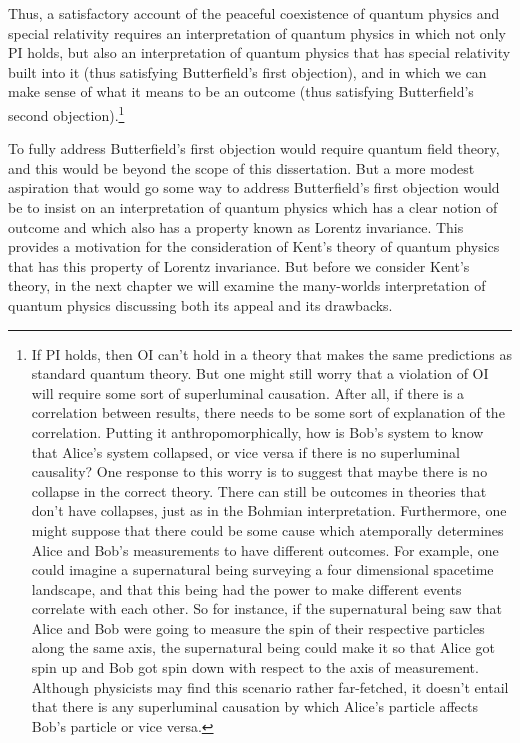 \documentclass[12pt]{report}
\begin{document}
Thus, a satisfactory account of the peaceful coexistence of quantum physics and special relativity requires an interpretation of quantum physics in which not only PI holds, but also an interpretation of quantum physics that has special relativity built into it (thus satisfying Butterfield's first objection), and in which we can make sense of what it means to be an outcome (thus satisfying Butterfield's second objection).\footnote{If PI holds, then OI can't hold in a theory that makes the same predictions as standard quantum theory. But one might still worry that  a violation of OI will require some sort of superluminal causation. After all, if there is a correlation between results, there needs to be some sort of explanation of the correlation. Putting it anthropomorphically, how is Bob's system to know that Alice's system collapsed, or vice versa if there is no superluminal causality? One response to this worry is to suggest that maybe there is no collapse in the correct theory. There can still be outcomes in theories that don't have collapses, just as in the Bohmian interpretation. Furthermore, one might suppose that there could be some cause which atemporally determines Alice and Bob's measurements to have different outcomes. For example, one could imagine a supernatural being surveying a four dimensional spacetime landscape, and that this being had the power to make different events correlate with each other. So for instance, if the supernatural being saw that Alice and Bob were going to measure the spin of their respective particles along the same axis, the supernatural being could make it so that Alice got spin up and Bob got spin down with respect to the axis of measurement. Although physicists may find this scenario rather far-fetched, it doesn't entail that there is any superluminal causation by which Alice's particle affects Bob's particle or vice versa.} 

To fully address Butterfield's first objection would require quantum field theory, and this would be beyond the scope of this dissertation. But a more modest aspiration that would go some way to address Butterfield's first objection would be to insist on an interpretation of quantum physics which has a clear notion of outcome and which also has a property known as Lorentz invariance. This provides a motivation for the consideration of Kent's theory of quantum physics that has this property of Lorentz invariance. But before we consider Kent's theory, in the next chapter we will examine the many-worlds interpretation of quantum physics discussing both its appeal and its drawbacks.
\end{document}
